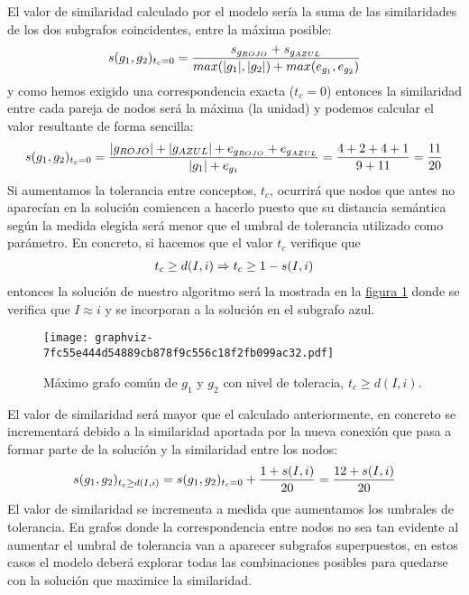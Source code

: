 \documentclass[a4paper,12pt,spanish]{book}
\begin{document}
El valor de similaridad calculado por el modelo sería la suma de las similaridades de
los dos subgrafos coincidentes, entre la máxima posible:
\begin{gather}
\begin{split}s(g_1, g_2)_{t_c=0}=\frac{s_{g_{ROJO}} + s_{g_{AZUL}}}{max(|g_1|, |g_2|) + max(e_{g_1}, e_{g_2})}\end{split}\notag
\end{gather}
y como hemos exigido una correspondencia exacta (\(t_c=0\)) entonces la similaridad
entre cada pareja de nodos será la máxima (la unidad) y podemos calcular el valor
resultante de forma sencilla:
\begin{gather}
\begin{split}s(g_1, g_2)_{t_c=0}=\frac{|g_{ROJO}| + |g_{AZUL}| + e_{g_{ROJO}} + e_{g_{AZUL}}}{|g_1| + e_{g_1}} = \frac{4 + 2 + 4 + 1}{9 + 11} = \frac{11}{20}\end{split}\notag
\end{gather}
Si aumentamos la tolerancia entre conceptos, \(t_c\), ocurrirá que nodos que
antes no aparecían en la solución comiencen a hacerlo puesto que su distancia semántica
según la medida elegida será menor que el umbral de tolerancia utilizado como
parámetro. En concreto, si hacemos que el valor \(t_c\) verifique que
\begin{gather}
\begin{split}t_c \geq d(I, i)  \Rightarrow  t_c \geq 1 - s(I, i)\end{split}\notag
\end{gather}
entonces la solución de nuestro algoritmo será la mostrada en la
\hyperref[4.model/ii.modelo:fig-model-example-mcs2]{figura  \ref*{4.model/ii.modelo:fig-model-example-mcs2}} donde se verifica que \(I \approx i\) y se
incorporan a la solución en el subgrafo azul.
\begin{figure}[htbp]
\centering
\capstart

\texttt{[image: graphviz-7fc55e444d54889cb878f9c556c18f2fb099ac32.pdf]}
\caption{Máximo grafo común de \(g_1\) y \(g_2\) con nivel de toleracia, \(t_c \geq d(I, i)\).}\label{4.model/ii.modelo:fig-model-example-mcs2}\end{figure}

El valor de similaridad será mayor que el calculado anteriormente, en concreto se
incrementará debido a la similaridad aportada por la nueva conexión que pasa a
formar parte de la solución y la similaridad entre los nodos:
\begin{gather}
\begin{split}s(g_1, g_2)_{t_c \geq d(I,i)}= s(g_1, g_2)_{t_c=0} + \frac{1 + s(I, i)}{20} = \frac{12 + s(I, i)}{20}\end{split}\notag
\end{gather}
El valor de similaridad se incrementa a medida que aumentamos los umbrales de
tolerancia. En grafos donde la correspondencia entre nodos no sea tan evidente al
aumentar el umbral de tolerancia van a aparecer subgrafos
superpuestos, en estos casos el modelo deberá explorar todas las combinaciones posibles
para quedarse con la solución que maximice la similaridad.
\newpage
\end{document}
